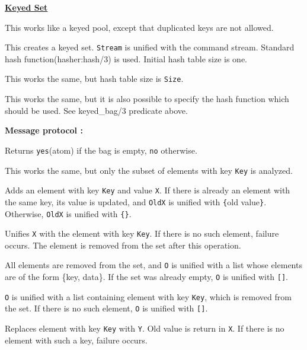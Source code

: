 \noindent\underline{\bf Keyed Set}\vspace{1ex}\par
This works like a keyed pool, except that duplicated keys are not allowed.
\begin{itemize}

This creates a keyed set. \verb|Stream| is unified with the command stream.
Standard hash function(hasher:hash/3) is used. Initial hash table size is one.

This works the same, but hash table size is \verb|Size|.

This works the same, but it is also possible to specify the hash function which
should be used. See keyed_bag/3 predicate above.

\end{itemize}
{\bf Message protocol :}
\begin{itemize}

Returns \verb|yes|(atom) if the bag is empty, \verb|no| otherwise.

This works the same, but only the subset of elements with key \verb|Key| is
analyzed.

Adds an element with key \verb|Key| and value \verb|X|. If there is already
an element with the same key, its value is updated, and \verb|OldX| is
unified with \verb|{|old value\verb|}|.
Otherwise, \verb|OldX| is unified with \verb|{}|.

Unifies \verb|X| with the element with key \verb|Key|. If there is no such
element, failure occurs. The element is removed from the set
after this operation.

All elements are removed from the set, and \verb|O| is unified with a list
whose elements are of the form \{key, data\}. If the set was already empty,
\verb|O| is unified with \verb|[]|.

\verb|O| is unified with a list containing element with key \verb|Key|, which
is removed from the set. If there is no such element, \verb|O| is unified with
\verb|[]|.

Replaces element with key \verb|Key| with \verb|Y|. Old value is return in
\verb|X|. If there is no element with such a key, failure occurs.

\end{itemize}
\vspace{1ex}

